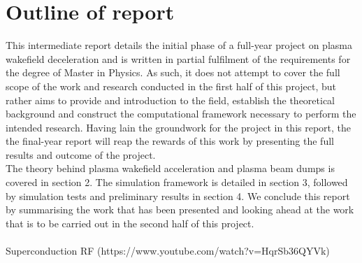 \documentclass[%
 onecolumn,notitlepage,
 amsmath,amssymb,
 aps,
 longbibliography
]{revtex4-1}
\begin{document}
\section{Outline of report}
This intermediate report details the initial phase of a full-year project on plasma wakefield deceleration and is written in partial fulfilment of the requirements for the degree of Master in Physics. As such, it does not attempt to cover the full scope of the work and research conducted in the first half of this project, but rather aims to provide and introduction to the field, establish the theoretical background and construct the computational framework necessary to perform the intended research. Having lain the groundwork for the project in this report, the the final-year report will reap the rewards of this work by presenting the full results and outcome of the project.\\
The theory behind plasma wakefield acceleration and plasma beam dumps is covered in section 2. The simulation framework is detailed in section 3, followed by simulation tests and preliminary results in section 4. We conclude this report by summarising the work that has been presented and looking ahead at the work that is to be carried out in the second half of this project.
\\
\\
Superconduction RF (https://www.youtube.com/watch?v=HqrSb36QYVk)
\end{document}
